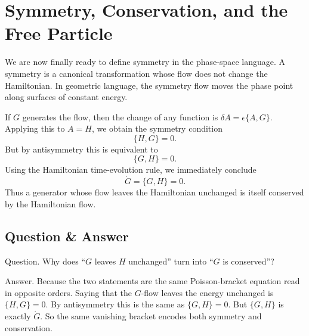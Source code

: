 \section{Symmetry, Conservation, and the Free Particle}

We are now finally ready to define symmetry in the phase-space language. A symmetry is a canonical transformation whose flow does not change the Hamiltonian. In geometric language, the symmetry flow moves the phase point along surfaces of constant energy.

If \(G\) generates the flow, then the change of any function is \(\delta A=\epsilon\{A,G\}\). Applying this to \(A=H\), we obtain the symmetry condition
\begin{equation}
\{H,G\}=0.
\end{equation}
But by antisymmetry this is equivalent to
\begin{equation}
\{G,H\}=0.
\end{equation}
Using the Hamiltonian time-evolution rule, we immediately conclude
\begin{equation}
\dot G=\{G,H\}=0.
\end{equation}
Thus a generator whose flow leaves the Hamiltonian unchanged is itself conserved by the Hamiltonian flow.

\subsection{Question \& Answer}

Question. Why does ``\(G\) leaves \(H\) unchanged'' turn into ``\(G\) is conserved''?

Answer. Because the two statements are the same Poisson-bracket equation read in opposite orders. Saying that the \(G\)-flow leaves the energy unchanged is \(\{H,G\}=0\). By antisymmetry this is the same as \(\{G,H\}=0\). But \(\{G,H\}\) is exactly \(\dot G\). So the same vanishing bracket encodes both symmetry and conservation.

